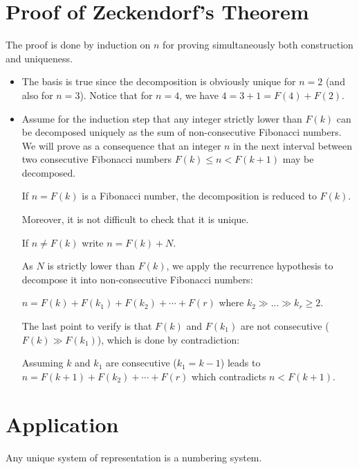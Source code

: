\section{Proof of Zeckendorf's Theorem}

The proof is done by induction on $n$ for proving simultaneously both construction and uniqueness.

\begin{itemize}
\item
The basis is true since the decomposition is obviously unique for $n=2$ (and also for $n=3$). 
Notice that for $n=4$, we have $4 = 3 + 1 = F(4) + F(2)$. 

\item
Assume for the induction step that any integer strictly lower than $F(k)$ can be decomposed uniquely as the sum of non-consecutive Fibonacci numbers.
We will prove as a consequence that an integer $n$ in the next interval between two consecutive Fibonacci numbers $F(k) \leq n < F(k+1)$ may be decomposed. 

If $n=F(k)$ is a Fibonacci number, the decomposition is reduced to $F(k)$.

Moreover, it is not difficult to check that it is unique.


\medskip

If $n \neq F(k)$ write $n = F(k) + N$.

As $N$ is strictly lower than $F(k)$, we apply the recurrence hypothesis to decompose it into non-consecutive Fibonacci numbers:

$n = F(k) + F(k_1) + F(k_2) + \cdots + F(r)$ where $k_2 \gg ... \gg k_r \geq 2$. 

The last point to verify is that $F(k)$ and $F(k_1)$ are not consecutive ($F(k) \gg F(k_1)$), which is done by contradiction:

Assuming $k$ and $k_1$ are consecutive ($k_1=k-1$) leads to $n = F(k+1) + F(k_2) + \cdots + F(r)$
which contradicts $n < F(k+1)$.
\end{itemize}


\section{Application}

Any unique system of representation is a numbering system.

